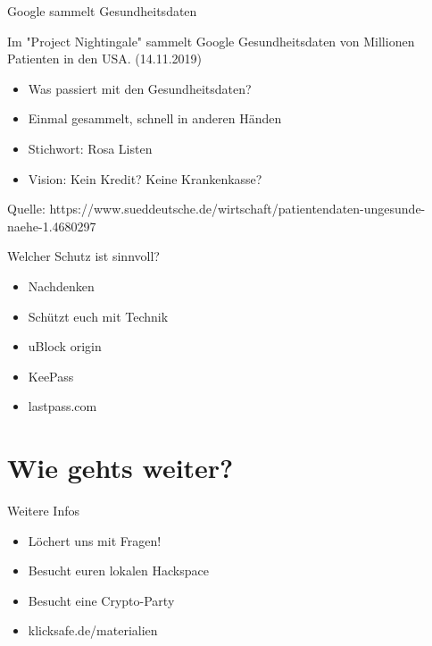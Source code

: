 \documentclass[10pt]{beamer}
\begin{document}
%
%
\begin{frame}[fragile]{Google sammelt Gesundheitsdaten}
      \begin{alertblock}{Im "Project Nightingale" sammelt Google Gesundheitsdaten von Millionen Patienten in den USA. (14.11.2019)}
    \begin{itemize}
    \item Was passiert mit den Gesundheitsdaten?
    \item Einmal gesammelt, schnell in anderen Händen
    \item Stichwort: Rosa Listen
    \item Vision: Kein Kredit? Keine Krankenkasse?
  \end{itemize}
      \end{alertblock}
      \tiny Quelle: https://www.sueddeutsche.de/wirtschaft/patientendaten-ungesunde-naehe-1.4680297
\end{frame}

%
%
\begin{frame}[fragile]{Welcher Schutz ist sinnvoll?}
    \begin{itemize}
    \item Nachdenken
    \item Schützt euch mit Technik
    \item \alert{uBlock origin}
    \item \alert{KeePass}
    \item \alert{lastpass.com}
  \end{itemize}
\end{frame}

\section{Wie gehts weiter?}

%
%
\begin{frame}{Weitere Infos}
\begin{itemize}
    \item Löchert uns mit Fragen!
    \item Besucht euren lokalen Hackspace
    \item Besucht eine Crypto-Party
    \item \alert{klicksafe.de/materialien}
  \end{itemize}
\end{frame}
\end{document}
